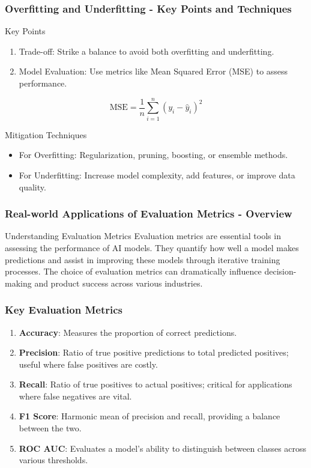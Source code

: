 \documentclass[aspectratio=169]{beamer}
\begin{document}
\begin{frame}[fragile]
    \frametitle{Overfitting and Underfitting - Key Points and Techniques}
    \begin{block}{Key Points}
        \begin{enumerate}
            \item Trade-off: Strike a balance to avoid both overfitting and underfitting.
            \item Model Evaluation: Use metrics like Mean Squared Error (MSE) to assess performance.
        \end{enumerate}
        \begin{equation}
            \text{MSE} = \frac{1}{n} \sum_{i=1}^{n} (y_i - \hat{y}_i)^2
        \end{equation}
    \end{block}

    \begin{block}{Mitigation Techniques}
        \begin{itemize}
            \item For Overfitting: Regularization, pruning, boosting, or ensemble methods.
            \item For Underfitting: Increase model complexity, add features, or improve data quality.
        \end{itemize}
    \end{block}
\end{frame}

\begin{frame}[fragile]
    \frametitle{Real-world Applications of Evaluation Metrics - Overview}
    \begin{block}{Understanding Evaluation Metrics}
        Evaluation metrics are essential tools in assessing the performance of AI models. They quantify how well a model makes predictions and assist in improving these models through iterative training processes. The choice of evaluation metrics can dramatically influence decision-making and product success across various industries.
    \end{block}
\end{frame}

\begin{frame}[fragile]
    \frametitle{Key Evaluation Metrics}
    \begin{enumerate}
        \item \textbf{Accuracy}: Measures the proportion of correct predictions.
        \item \textbf{Precision}: Ratio of true positive predictions to total predicted positives; useful where false positives are costly.
        \item \textbf{Recall}: Ratio of true positives to actual positives; critical for applications where false negatives are vital.
        \item \textbf{F1 Score}: Harmonic mean of precision and recall, providing a balance between the two.
        \item \textbf{ROC AUC}: Evaluates a model's ability to distinguish between classes across various thresholds.
    \end{enumerate}
\end{frame}
\end{document}
